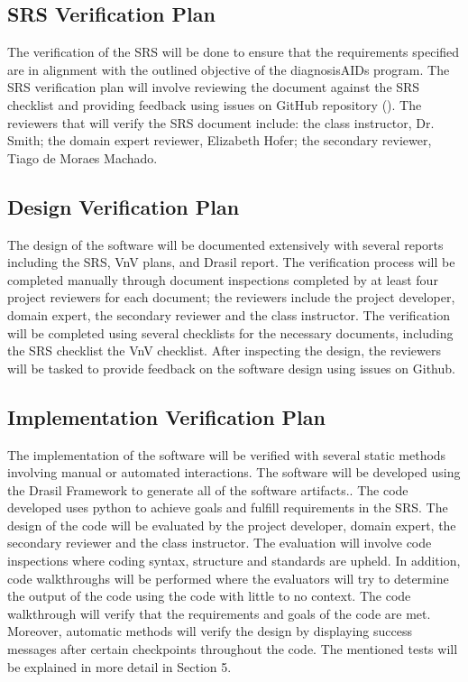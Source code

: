 \documentclass[12pt, titlepage]{article}
\begin{document}
\subsection{SRS Verification Plan}

The verification of the SRS will be done to ensure that the requirements 
specified are in alignment with the outlined objective of the diagnosisAIDs 
program. The SRS verification plan  will involve reviewing the document against 
the SRS checklist and providing feedback using issues on GitHub repository (\citet{SRSchecklist}). The 
reviewers that will verify the SRS document include: the class instructor, Dr. 
Smith;  the domain expert reviewer, Elizabeth Hofer; the secondary reviewer, 
Tiago de Moraes Machado.

\subsection{Design Verification Plan}

The design of the software will be documented extensively with several reports 
including the SRS, VnV plans, and Drasil report. The verification process will be 
completed manually through document inspections completed by at least four 
project reviewers for each document; the reviewers include the project 
developer, domain expert, the secondary reviewer and the class instructor. The 
verification will be completed using several checklists for the necessary 
documents, including the SRS checklist the VnV checklist. 
After inspecting the design, the reviewers will be tasked to provide feedback on 
the software design using issues on Github. 

\subsection{Implementation Verification Plan}

The implementation of the software will be verified with several static methods 
involving manual or automated interactions. The software will be developed using 
the Drasil Framework to generate all of the software artifacts.\citet{Drasil}. The code 
developed uses python to achieve goals and fulfill requirements in the SRS. The 
design of the code will be evaluated by the project developer, domain expert, 
the secondary reviewer and the class instructor. The evaluation will involve 
code inspections where coding syntax, structure and standards are upheld. In 
addition, code walkthroughs will be performed where the evaluators will try to 
determine the output of the code using the code with little to no context. The 
code walkthrough will verify that the requirements and goals of the code are 
met. Moreover, automatic methods will verify the design by displaying success 
messages after certain checkpoints throughout the code. The mentioned tests will 
be explained in more detail in Section 5.
\end{document}
